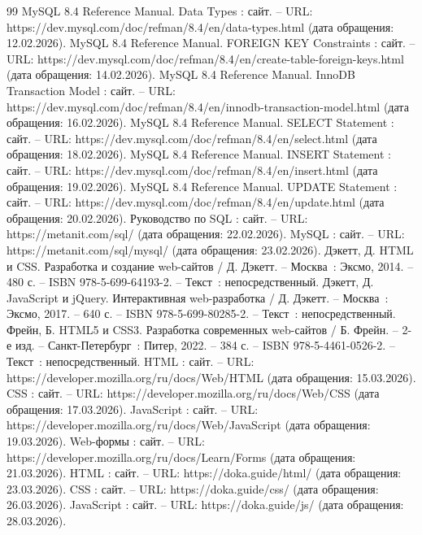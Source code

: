 \begin{thebibliography}{99}
	 MySQL 8.4 Reference Manual. Data Types : сайт. -- URL: https://dev.mysql.com/doc/refman/8.4/en/data-types.html (дата обращения: 12.02.2026).
	 MySQL 8.4 Reference Manual. FOREIGN KEY Constraints : сайт. -- URL: https://dev.mysql.com/doc/refman/8.4/en/create-table-foreign-keys.html (дата обращения: 14.02.2026).
	 MySQL 8.4 Reference Manual. InnoDB Transaction Model : сайт. -- URL: https://dev.mysql.com/doc/refman/8.4/en/innodb-transaction-model.html (дата обращения: 16.02.2026).
	 MySQL 8.4 Reference Manual. SELECT Statement : сайт. -- URL: https://dev.mysql.com/doc/refman/8.4/en/select.html (дата обращения: 18.02.2026).
	 MySQL 8.4 Reference Manual. INSERT Statement : сайт. -- URL: https://dev.mysql.com/doc/refman/8.4/en/insert.html (дата обращения: 19.02.2026).
	 MySQL 8.4 Reference Manual. UPDATE Statement : сайт. -- URL: https://dev.mysql.com/doc/refman/8.4/en/update.html (дата обращения: 20.02.2026).
	 Руководство по SQL : сайт. -- URL: https://metanit.com/sql/ (дата обращения: 22.02.2026).
	 MySQL : сайт. -- URL: https://metanit.com/sql/mysql/ (дата обращения: 23.02.2026).
	 Дэкетт, Д. HTML и CSS. Разработка и создание web-сайтов / Д. Дэкетт. -- Москва~: Эксмо, 2014. -- 480 с. -- ISBN 978-5-699-64193-2. -- Текст~: непосредственный.
	 Дэкетт, Д. JavaScript и jQuery. Интерактивная web-разработка / Д. Дэкетт. -- Москва~: Эксмо, 2017. -- 640 с. -- ISBN 978-5-699-80285-2. -- Текст~: непосредственный.
	 Фрейн, Б. HTML5 и CSS3. Разработка современных web-сайтов / Б. Фрейн. -- 2-е изд. -- Санкт-Петербург~: Питер, 2022. -- 384 с. -- ISBN 978-5-4461-0526-2. -- Текст~: непосредственный.
	 HTML : сайт. -- URL: https://developer.mozilla.org/ru/docs/Web/HTML (дата обращения: 15.03.2026).
	 CSS : сайт. -- URL: https://developer.mozilla.org/ru/docs/Web/CSS (дата обращения: 17.03.2026).
	 JavaScript : сайт. -- URL: https://developer.mozilla.org/ru/docs/Web/\allowbreak JavaScript (дата обращения: 19.03.2026).
	 Web-формы : сайт. -- URL: https://developer.mozilla.org/ru/docs/Learn/\allowbreak Forms (дата обращения: 21.03.2026).
	 HTML : сайт. -- URL: https://doka.guide/html/ (дата обращения: 23.03.2026).
	 CSS : сайт. -- URL: https://doka.guide/css/ (дата обращения: 26.03.2026).
	 JavaScript : сайт. -- URL: https://doka.guide/js/ (дата обращения: 28.03.2026).

\end{thebibliography}
